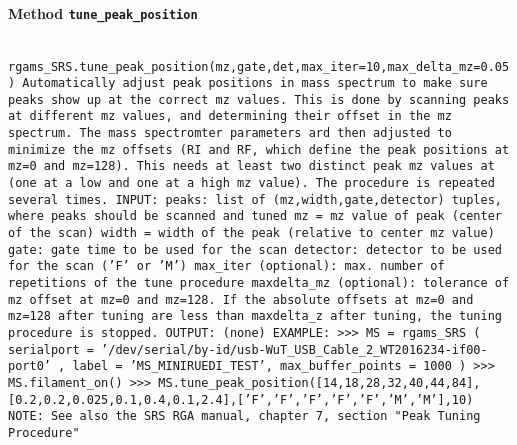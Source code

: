 \paragraph{Method \texttt{tune_peak_position}}
\vspace{1ex}
\texttt{\newline
rgams_SRS.tune_peak_position(mz,gate,det,max_iter=10,max_delta_mz=0.05)\newline
\newline
Automatically adjust peak positions in mass spectrum to make sure peaks show up at the correct mz values. This is done by scanning peaks at different mz values, and determining their offset in the mz spectrum. The mass spectromter parameters ard then adjusted to minimize the mz offsets (RI and RF, which define the peak positions at mz=0 and mz=128). This needs at least two distinct peak mz values at (one at a low and one at a high mz value). The procedure is repeated several times.\newline
\newline
INPUT:\newline
peaks: list of (mz,width,gate,detector) tuples, where peaks should be scanned and tuned\newline
mz = mz value of peak (center of the scan)\newline
width = width of the peak (relative to center mz value)\newline
gate: gate time to be used for the scan\newline
detector: detector to be used for the scan ('F' or 'M')\newline
\newline
max_iter (optional): max. number of repetitions of the tune procedure\newline
maxdelta_mz (optional): tolerance of mz offset at mz=0 and mz=128. If the absolute offsets at mz=0 and mz=128 after tuning are less than maxdelta_z after tuning, the tuning procedure is stopped.\newline
\newline
OUTPUT:\newline
(none)\newline
\newline
EXAMPLE:\newline
>>> MS = rgams_SRS ( serialport = '/dev/serial/by-id/usb-WuT_USB_Cable_2_WT2016234-if00-port0' , label = 'MS_MINIRUEDI_TEST', max_buffer_points = 1000 )\newline
>>> MS.filament_on()\newline
>>> MS.tune_peak_position([14,18,28,32,40,44,84],[0.2,0.2,0.025,0.1,0.4,0.1,2.4],['F','F','F','F','F','M','M'],10)\newline
\newline
NOTE:\newline
See also the SRS RGA manual, chapter 7, section "Peak Tuning Procedure"\newline
\newline
}

